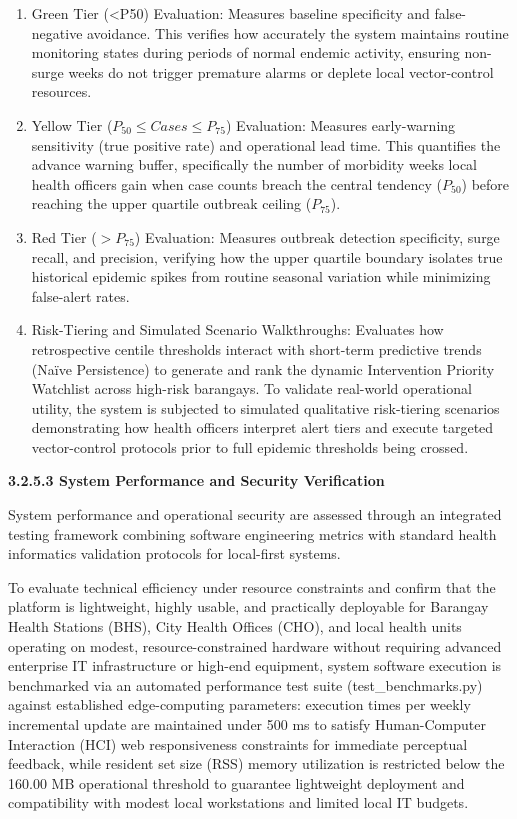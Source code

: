 \documentclass[
]{article}
\begin{document}
\begin{enumerate}
\def\labelenumi{\arabic{enumi}.}
\item
  Green Tier (\textless P50) Evaluation: Measures baseline specificity
  and false-negative avoidance. This verifies how accurately the system
  maintains routine monitoring states during periods of normal endemic
  activity, ensuring non-surge weeks do not trigger premature alarms or
  deplete local vector-control resources.
\item
  Yellow Tier (\(P_{50} \leq Cases \leq P_{75}\)) Evaluation: Measures
  early-warning sensitivity (true positive rate) and operational lead
  time. This quantifies the advance warning buffer, specifically the
  number of morbidity weeks local health officers gain when case counts
  breach the central tendency (\(P_{50}\)) before reaching the upper
  quartile outbreak ceiling (\(P_{75}\)).
\item
  Red Tier (\(> P_{75}\)) Evaluation: Measures outbreak detection
  specificity, surge recall, and precision, verifying how the upper
  quartile boundary isolates true historical epidemic spikes from
  routine seasonal variation while minimizing false-alert rates.
\item
  Risk-Tiering and Simulated Scenario Walkthroughs: Evaluates how
  retrospective centile thresholds interact with short-term predictive
  trends (Naïve Persistence) to generate and rank the dynamic
  Intervention Priority Watchlist across high-risk barangays. To
  validate real-world operational utility, the system is subjected to
  simulated qualitative risk-tiering scenarios demonstrating how health
  officers interpret alert tiers and execute targeted vector-control
  protocols prior to full epidemic thresholds being crossed.
\end{enumerate}

\textbf{3.2.5.3 System Performance and Security Verification}

System performance and operational security are assessed through an
integrated testing framework combining software engineering metrics with
standard health informatics validation protocols for local-first
systems.

To evaluate technical efficiency under resource constraints and confirm
that the platform is lightweight, highly usable, and practically
deployable for Barangay Health Stations (BHS), City Health Offices
(CHO), and local health units operating on modest, resource-constrained
hardware without requiring advanced enterprise IT infrastructure or
high-end equipment, system software execution is benchmarked via an
automated performance test suite (test\_benchmarks.py) against
established edge-computing parameters: execution times per weekly
incremental update are maintained under 500 ms to satisfy Human-Computer
Interaction (HCI) web responsiveness constraints for immediate
perceptual feedback, while resident set size (RSS) memory utilization is
restricted below the 160.00 MB operational threshold to guarantee
lightweight deployment and compatibility with modest local workstations
and limited local IT budgets.
\end{document}
